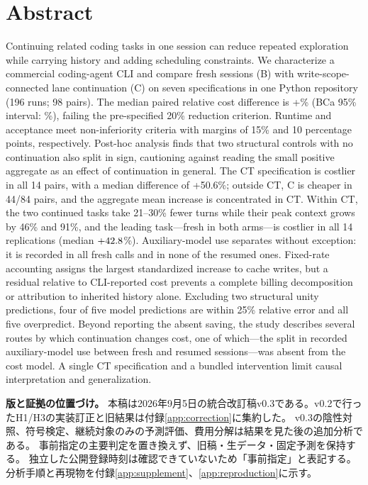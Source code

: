 \documentclass[a4paper,11pt]{article}
\begin{document}
\section*{Abstract}
Continuing related coding tasks in one session can reduce repeated exploration while carrying history and adding scheduling constraints. We characterize a commercial coding-agent CLI and compare fresh sessions (B) with write-scope-connected lane continuation (C) on seven specifications in one Python repository (196 runs; 98 pairs). The median paired relative cost difference is +\CostMedian\% (BCa 95\% interval: \CostCI\%), failing the pre-specified 20\% reduction criterion. Runtime and acceptance meet non-inferiority criteria with margins of 15\% and 10 percentage points, respectively. Post-hoc analysis finds that two structural controls with no continuation also split in sign, cautioning against reading the small positive aggregate as an effect of continuation in general. The CT specification is costlier in all 14 pairs, with a median difference of +50.6\%; outside CT, C is cheaper in 44/84 pairs, and the aggregate mean increase is concentrated in CT. Within CT, the two continued tasks take 21--30\% fewer turns while their peak context grows by 46\% and 91\%, and the leading task---fresh in both arms---is costlier in all 14 replications (median $+42.8$\%). Auxiliary-model use separates without exception: it is recorded in all \AuxFresh{} fresh calls and in none of the \AuxResumed{} resumed ones. Fixed-rate accounting assigns the largest standardized increase to cache writes, but a residual relative to CLI-reported cost prevents a complete billing decomposition or attribution to inherited history alone. Excluding two structural unity predictions, four of five model predictions are within 25\% relative error and all five overpredict. Beyond reporting the absent saving, the study describes several routes by which continuation changes cost, one of which---the split in recorded auxiliary-model use between fresh and resumed sessions---was absent from the cost model. A single CT specification and a bundled intervention limit causal interpretation and generalization.

\vspace{1em}
\noindent\textbf{版と証拠の位置づけ。}
本稿は2026年9月5日の統合改訂稿v0.3である。v0.2で行ったH1/H3の実装訂正と旧結果は付録\ref{app:correction}に集約した。
v0.3の陰性対照、符号検定、継続対象のみの予測評価、費用分解は結果を見た後の追加分析である。
事前指定の主要判定を置き換えず、旧稿・生データ・固定予測を保持する。
独立した公開登録時刻は確認できていないため「事前指定」と表記する。
分析手順と再現物を付録\ref{app:supplement}、\ref{app:reproduction}に示す。
\end{document}
